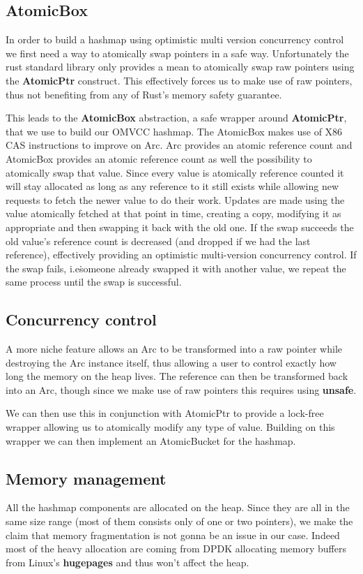 \documentclass[11pt]{article}
\begin{document}
\subsection{AtomicBox}

In order to build a hashmap using optimistic multi version concurrency
control we first need a way to atomically swap pointers in a safe
way. Unfortunately the rust standard library only provides a mean to
atomically swap raw pointers using the \textbf{AtomicPtr}
construct. This effectively forces us to make use of raw pointers,
thus not benefiting from any of Rust's memory safety guarantee.

This leads to the \textbf{AtomicBox} abstraction, a safe wrapper
around \textbf{AtomicPtr}, that we use to build our OMVCC hashmap.
The AtomicBox makes use of X86 CAS instructions to improve on Arc.
Arc provides an atomic reference count and AtomicBox provides an
atomic reference count as well the possibility to atomically swap that
value. Since every value is atomically reference counted it will stay
allocated as long as any reference to it still exists while allowing
new requests to fetch the newer value to do their work. Updates are
made using the value atomically fetched at that point in time,
creating a copy, modifying it as appropriate and then swapping it back
with the old one. If the swap succeeds the old value's reference count
is decreased (and dropped if we had the last reference), effectively
providing an optimistic multi-version concurrency control. If the swap
fails, i.e\. someone already swapped it with another value, we repeat
the same process until the swap is successful.

\subsection{Concurrency control}
A more niche feature allows an Arc to be transformed into a
raw pointer while destroying the Arc instance itself, thus allowing
a user to control exactly how long the memory on the heap lives.
The reference can then be transformed back into an Arc, though since
we make use of raw pointers this requires using \textbf{unsafe}.

We can then use this in conjunction with AtomicPtr to provide a
lock-free wrapper allowing us to atomically modify any type of value.
Building on this wrapper we can then implement an AtomicBucket for the
hashmap.

\subsection{Memory management}
All the hashmap components are allocated on the heap. Since they are
all in the same size range (most of them consists only of one or two
pointers), we make the claim that memory fragmentation is not gonna be
an issue in our case. Indeed most of the heavy allocation are coming
from DPDK allocating memory buffers from Linux's \textbf{hugepages}
and thus won't affect the heap.
\end{document}
